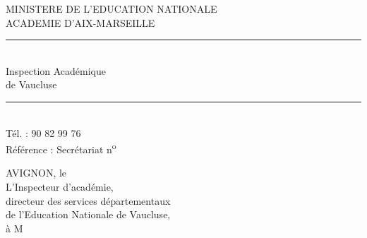 
MINISTERE DE L'EDUCATION NATIONALE\\
ACADEMIE D'AIX-MARSEILLE\\
\rule{2em}{.3pt}\\
Inspection Académique\\
de Vaucluse\\
\rule{2em}{.3pt}\\
Tél. : 90 82 99 76\\
Référence : Secrétariat n\textsuperscript{o}

AVIGNON, le\\[1ex]
L'Inspecteur d'académie,\\
directeur des services départementaux\\
de l'Education Nationale de Vaucluse,\\[1ex]
à M

